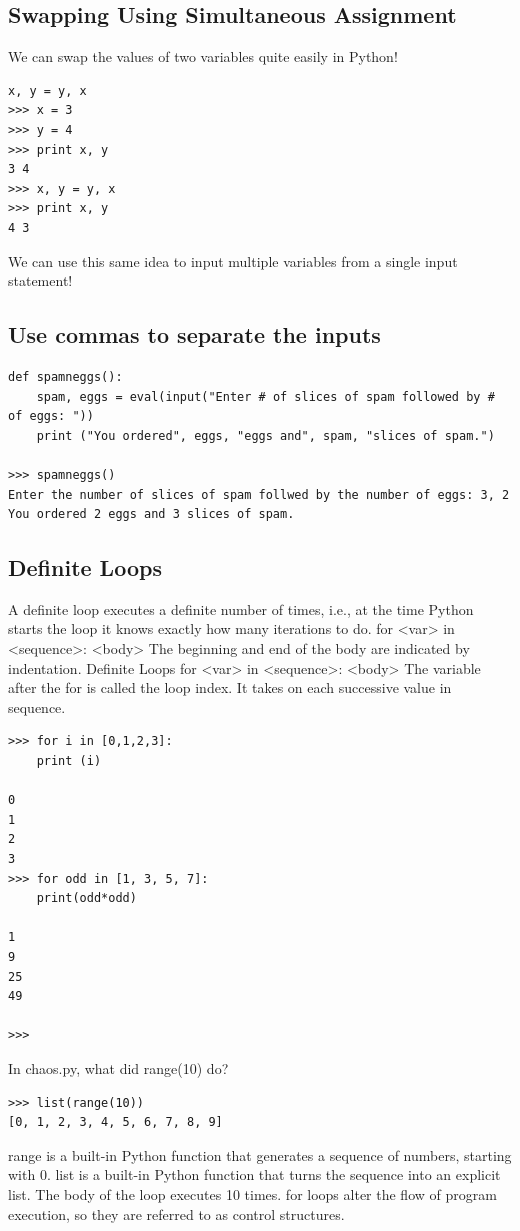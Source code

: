 \documentclass[12pt,a4paper,final,twoside,titlepage]{book}
\begin{document}
\subsection{Swapping Using Simultaneous Assignment}
We can swap the values of two variables quite easily in Python!
\lstset{language=Python, tabsize=4}
\begin{lstlisting}
x, y = y, x
>>> x = 3
>>> y = 4
>>> print x, y
3 4
>>> x, y = y, x
>>> print x, y
4 3
\end{lstlisting}
We can use this same idea to input multiple variables from a single input statement!
\subsection{Use commas to separate the inputs}
\lstset{language=Python, tabsize=4}
\begin{lstlisting}
def spamneggs():
	spam, eggs = eval(input("Enter # of slices of spam followed by # of eggs: "))
	print ("You ordered", eggs, "eggs and", spam, "slices of spam.")
	
>>> spamneggs()
Enter the number of slices of spam follwed by the number of eggs: 3, 2
You ordered 2 eggs and 3 slices of spam.
\end{lstlisting}

\subsection{Definite Loops}
A definite loop executes a definite number of times, i.e., at the time Python starts the loop it knows exactly how many iterations to do.
for <var> in <sequence>:
	<body>
The beginning and end of the body are indicated by indentation.
Definite Loops
for <var> in <sequence>:
<body>
The variable after the for is called the loop index. It takes on each successive value in sequence.
\lstset{language=Python, tabsize=4}
\begin{lstlisting}
>>> for i in [0,1,2,3]:
	print (i)

0
1
2
3
>>> for odd in [1, 3, 5, 7]:
	print(odd*odd)

1
9
25
49

>>> 
\end{lstlisting}
In chaos.py, what did range(10) do?
\lstset{language=Python, tabsize=4}
\begin{lstlisting}
>>> list(range(10))
[0, 1, 2, 3, 4, 5, 6, 7, 8, 9]
\end{lstlisting}
range is a built-in Python function that generates a sequence of numbers, starting with 0. list is a built-in Python function that turns the sequence into an explicit list. The body of the loop executes 10 times. for loops alter the flow of program execution, so they are referred to as control structures.
\end{document}
